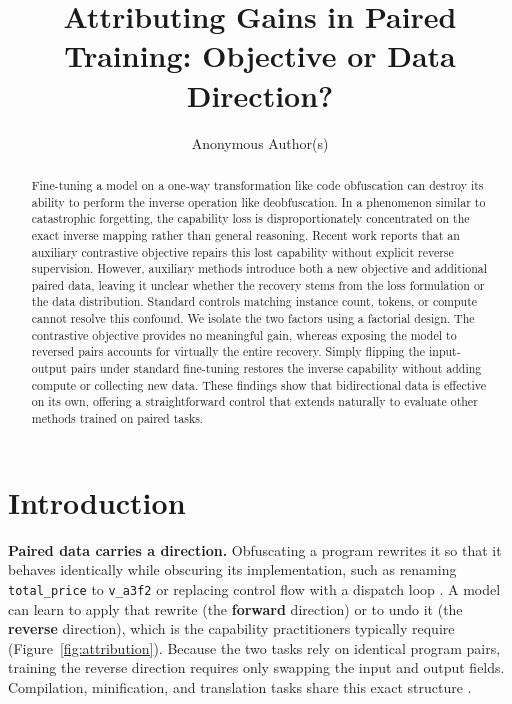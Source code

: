 \documentclass{article}
\title{Attributing Gains in Paired Training: Objective or Data Direction? }
\author{Anonymous Author(s)}
\begin{document}
\maketitle

\begin{abstract}
Fine-tuning a model on a one-way transformation like code obfuscation can destroy its ability to perform the inverse operation like deobfuscation. In a phenomenon similar to catastrophic forgetting, the capability loss is disproportionately concentrated on the exact inverse mapping rather than general reasoning. Recent work reports that an auxiliary contrastive objective repairs this lost capability without explicit reverse supervision. However, auxiliary methods introduce both a new objective and additional paired data, leaving it unclear whether the recovery stems from the loss formulation or the data distribution. Standard controls matching instance count, tokens, or compute cannot resolve this confound. We isolate the two factors using a factorial design. The contrastive objective provides no meaningful gain, whereas exposing the model to reversed pairs accounts for virtually the entire recovery. Simply flipping the input-output pairs under standard fine-tuning restores the inverse capability without adding compute or collecting new data. These findings show that bidirectional data is effective on its own, offering a straightforward control that extends naturally to evaluate other methods trained on paired tasks.
\end{abstract}

\section{Introduction}
\textbf{Paired data carries a direction.} Obfuscating a program rewrites it so that it behaves
identically while obscuring its implementation, such as renaming \texttt{total\_price} to \texttt{v\_a3f2} or
replacing control flow with a dispatch loop \citep{nikiema2025contrastive}. A model can learn to apply that rewrite (the \textbf{forward} direction)
or to undo it (the \textbf{reverse} direction), which is the capability practitioners typically require
\citep{roziere2021dobf} (Figure~\ref{fig:attribution}).
Because the two tasks rely on identical program pairs, training the reverse direction requires only swapping the input and output fields.
Compilation, minification, and translation tasks share this exact structure \citep{tan2024llm4decompile}.
\end{document}
